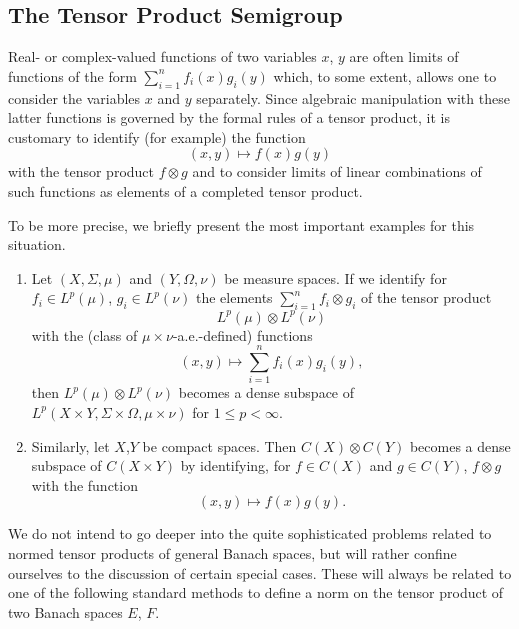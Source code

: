 \subsection{The Tensor Product Semigroup}\label{subsec:a1-3.8}%
Real- or complex-valued functions of two variables $x$, $y$ are often limits of functions of the form $\sum_{i=1}^{n} f_{i}(x)g_{i}(y)$ which, to some extent, allows one to consider the variables $x$ and $y$ separately.
Since algebraic manipulation with these latter functions is governed by the formal rules of a tensor product, it is customary to identify (for example) the function
\[
    (x,y) \mapsto f(x)g(y)
\]
with the tensor product $f \otimes g$ and to consider limits of linear combinations of such functions as elements of a completed tensor product.

To be more precise, we briefly present the most important examples for this situation.
\begin{examples*}\label{ex:a1-5.1}
\begin{enumerate}[\upshape(i), wide, labelindent=.25em]

\item
Let $(X,\Sigma,\mu)$ and $(Y,\Omega,\nu)$ be measure spaces. 
If we identify for $f_{i} \in L^{p}(\mu)$, $g_{i} \in L^{p}(\nu)$ the elements $\sum_{i=1}^{n} f_{i} \otimes g_{i}$ of the tensor product
\[
    L^{p}(\mu) \otimes L^{p}(\nu)
\]
with the (class of\/ $\mu \times \nu$-a.e.-defined) functions
\[
    (x,y) \mapsto \sum_{i=1}^{n} f_{i}(x)g_{i}(y) ,
\]
then $L^{p}(\mu) \otimes L^{p}(\nu)$ becomes a dense subspace of\/ $L^{p}(X\times Y,\Sigma\times\Omega,\mu\times\nu)$ for $1 \leq p < \infty$.

\item
Similarly, let $X$,$Y$ be compact spaces. Then $C(X) \otimes C(Y)$ becomes a dense subspace of\/ $C(X\times Y)$ by identifying, for $f \in C(X)$ and $g \in C(Y)$, $f \otimes g$ with the function
\[
    (x,y) \mapsto f(x)g(y) .
\]
\end{enumerate}
\end{examples*}
We do not intend to go deeper into the quite sophisticated problems related to normed tensor products of general Banach spaces, but will rather confine ourselves to the discussion of certain special cases.
These will always be related to one of the following standard methods to define a norm on the tensor product of two Banach spaces $E$, $F$.

